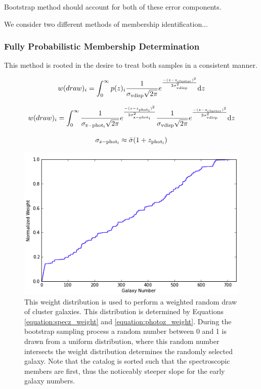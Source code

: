 Bootstrap method should account for both of these error components.

We consider two different methods of membership identification...

\subsubsection{Fully Probabilistic Membership Determination}

This method is rooted in the desire to treat both samples in a consistent manner.


\begin{equation}
w(draw)_i = \int_{0}^{\infty} p(z)_i \frac{1}{\sigma_{\rm vdisp}\sqrt{2\pi}}e^{\frac{-(z-z_{\rm cluster})^2}{2\sigma_{\rm vdisp}^2}}\mathrm{d}z
\label{equation:specz_weight}
\end{equation}

\begin{equation}
w(draw)_i = \int_{0}^{\infty} \frac{1}{\sigma_{\rm z-phot_{i}}\sqrt{2\pi}}e^{\frac{-(z-z_{\rm phot_{i}})^2}{2\sigma_{\rm z-phot_{i}}^2}} \frac{1}{\sigma_{\rm vdisp}\sqrt{2\pi}}e^{\frac{-(z-z_{\rm cluster})^2}{2\sigma_{\rm vdisp}^2}}\mathrm{d}z
\label{equation:photoz_weight}
\end{equation}

\begin{equation}
\sigma_{\rm z-phot_{i}} \approx \bar{\sigma}(1+z_{\rm phot_{i}})
\label{equation:SigmazPhot}
\end{equation}



\begin{figure}
\centering
\includegraphics[width=5in]{Chapter4/AnalysisFiles/cumnormwghtdist.png}
\caption[Probabilistic scheme; cumulative normalized weight distribution for galaxies being in the Musket Ball Cluster.]{
This weight distribution is used to perform a weighted random draw of cluster galaxies.
This distribution is determined by Equations \ref{equation:specz_weight} and \ref{equation:photoz_weight}.
During the bootstrap sampling process a random number between 0 and 1 is drawn from a uniform distribution, where this random number intersects the weight distribution determines the randomly selected galaxy.
Note that the catalog is sorted such that the spectroscopic members are first, thus the noticeably steeper slope for the early galaxy numbers.
}
\label{figure:NormWeightDist}
\end{figure}

